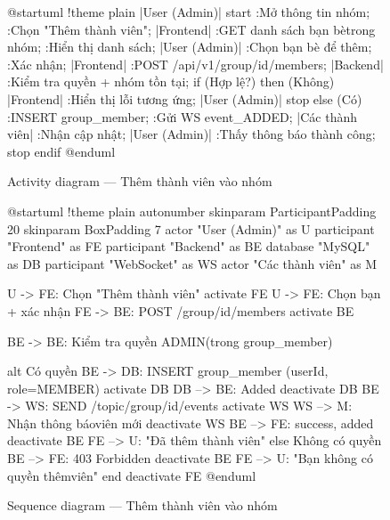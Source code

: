 \documentclass[12pt,a4paper]{report}
\begin{document}
\begin{figure}[H]
    \centering
    \begin{plantuml}
        @startuml
        !theme plain
        |User (Admin)|
        start
        :Mở thông tin nhóm;
        :Chọn "Thêm thành viên";
        |Frontend|
        :GET danh sách bạn bè trong nhóm;
        :Hiển thị danh sách;
        |User (Admin)|
        :Chọn bạn bè để thêm;
        :Xác nhận;
        |Frontend|
        :POST /api/v1/group/{id}/members;
        |Backend|
        :Kiểm tra quyền + nhóm tồn tại;
        if (Hợp lệ?) then (Không)
          |Frontend|
          :Hiển thị lỗi tương ứng;
          |User (Admin)|
          stop
        else (Có)
          :INSERT group_member;
          :Gửi WS event\nMEMBER_ADDED;
          |Các thành viên|
          :Nhận cập nhật;
          |User (Admin)|
          :Thấy thông báo thành công;
          stop
        endif
        @enduml
    \end{plantuml}
    \caption{Activity diagram --- Thêm thành viên vào nhóm}
\end{figure}

\begin{figure}[H]
    \centering
    \begin{plantuml}
        @startuml
        !theme plain
        autonumber
        skinparam ParticipantPadding 20
        skinparam BoxPadding 7
        actor "User (Admin)" as U
        participant "Frontend" as FE
        participant "Backend" as BE
        database "MySQL" as DB
        participant "WebSocket" as WS
        actor "Các thành viên" as M

        U -> FE: Chọn "Thêm thành viên"
        activate FE
        U -> FE: Chọn bạn + xác nhận
        FE -> BE: POST /group/{id}/members 
        activate BE

        BE -> BE: Kiểm tra quyền ADMIN\n(trong group_member)

        alt Có quyền
          BE -> DB: INSERT group_member \n(userId, role=MEMBER)
          activate DB
          DB --> BE: Added
          deactivate DB
          BE -> WS: SEND /topic/group/{id}/events
          activate WS
          WS --> M: Nhận thông báo viên mới
          deactivate WS
          BE --> FE: { success, added }
          deactivate BE
          FE --> U: "Đã thêm thành viên"
        else Không có quyền
          BE --> FE: 403 Forbidden
          deactivate BE
          FE --> U: "Bạn không có quyền thêm viên"
        end
        deactivate FE
        @enduml
    \end{plantuml}
    \caption{Sequence diagram --- Thêm thành viên vào nhóm}
\end{figure}
\end{document}
